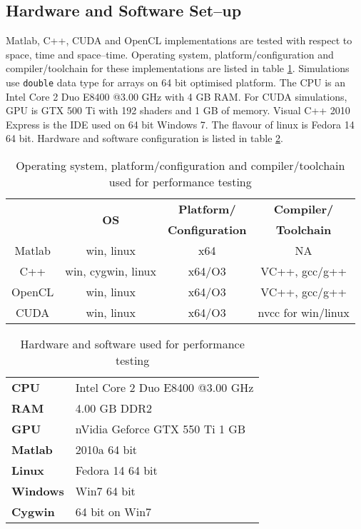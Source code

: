 \subsection{Hardware and Software Set--up}
Matlab, C++, CUDA and OpenCL implementations are tested with respect to space, time and space--time. Operating system, platform/configuration and compiler/toolchain for these implementations are listed in table \ref{Tab:OS-Platform/Configuration-Compiler/Toolchain-for-Testing}. Simulations use \verb|double| data type for arrays on 64 bit optimised platform. The CPU is an Intel Core 2 Duo E8400 @3.00 GHz with 4 GB RAM. For CUDA simulations, GPU is GTX 500 Ti with 192 shaders and 1 GB of memory. Visual C++ 2010 Express is the IDE used on 64 bit Windows 7. The flavour of linux is Fedora 14 64 bit. Hardware and software configuration is listed in table \ref{Tab:Hardware-Software-Configuration-for-Testing}.
\begin{table}[H]
\begin{center}
\vspace{0.3cm}
	\begin{tabular}{cccc}
	\hline \hline
		\rule{0pt}{2.6ex} & \multirow{2}{*}{\textbf{OS}} & \textbf{Platform/} & \textbf{Compiler/}\\
		& & \textbf{Configuration} & \textbf{Toolchain}\\
		\hline
		Matlab \rule{0pt}{2.6ex} & win, linux & x64 & NA\\
		C++ & win, cygwin, linux & x64/O3 & VC++, gcc/g++\\
		OpenCL & win, linux & x64/O3 & VC++, gcc/g++\\
		CUDA & win, linux & x64/O3 & nvcc for win/linux\\
	\hline \hline
	\end{tabular}
\end{center}
\caption{Operating system, platform/configuration and compiler/toolchain used for performance testing}
\label{Tab:OS-Platform/Configuration-Compiler/Toolchain-for-Testing}
\end{table}
\begin{table}[H]
\begin{center}
\vspace{0.3cm}
	\begin{tabular}{ll}
	\hline \hline
		\textbf{CPU} \rule{0pt}{2.6ex}& Intel Core 2 Duo E8400 @3.00 GHz\\
		\textbf{RAM} & 4.00 GB DDR2\\
		\textbf{GPU} & nVidia Geforce GTX 550 Ti 1 GB\\
		\textbf{Matlab} & 2010a 64 bit\\
		\textbf{Linux} & Fedora 14 64 bit\\
		\textbf{Windows} & Win7 64 bit\\
		\textbf{Cygwin} & 64 bit on Win7\\
	\hline \hline
	\end{tabular}
\end{center}
\caption{Hardware and software used for performance testing}
\label{Tab:Hardware-Software-Configuration-for-Testing}
\end{table}

